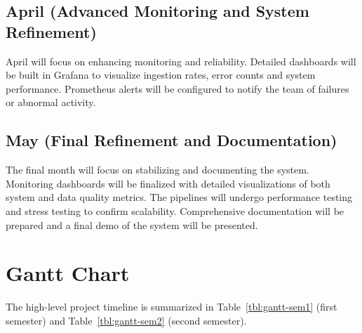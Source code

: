 \documentclass[12pt,oneside,openright,a4paper]{cpe-english-project}
\begin{document}
\subsection{April (Advanced Monitoring and System Refinement)}
April will focus on enhancing monitoring and reliability. Detailed dashboards will be built in Grafana to visualize ingestion rates, error counts and system performance. Prometheus alerts will be configured to notify the team of failures or abnormal activity.

\subsection{May (Final Refinement and Documentation)}
The final month will focus on stabilizing and documenting the system. Monitoring dashboards will be finalized with detailed visualizations of both system and data quality metrics. The pipelines will undergo performance testing and stress testing to confirm scalability. Comprehensive documentation will be prepared and a final demo of the system will be presented.

\section{Gantt Chart}

The high-level project timeline is summarized in Table~\ref{tbl:gantt-sem1} (first semester) and Table~\ref{tbl:gantt-sem2} (second semester).
\end{document}
